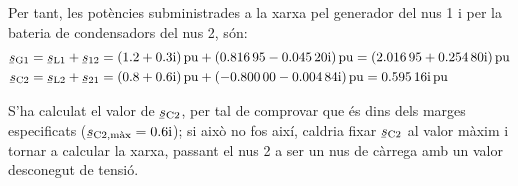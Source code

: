 \begin{exemple}
    Per tant, les potències subministrades a la xarxa pel generador del
    nus 1 i per la bateria de condensadors del nus 2, són:
    \begin{align*}
     \cmplx{s}\ped{G1} &= \cmplx{s}\ped{L1} + \cmplx{s}_{12} = \complexqty{1,2+j0,3}{pu} + \complexqty{0,81695 - j 0,04520}{pu} =
     \complexqty{2,01695 + j 0,25480}{pu} \\
     \cmplx{s}\ped{C2} &= \cmplx{s}\ped{L2} + \cmplx{s}_{21} = \complexqty{0,8+j0,6}{pu} + \complexqty{-0,80000 - j 0,00484}{pu} =
     \complexqty{  j 0,59516}{pu}
    \end{align*}

    S'ha calculat el valor de $\cmplx{s}\ped{C2}$, per tal de comprovar
    que és dins dels marges especificats
    ($\cmplx{s}\ped{C2,\text{màx}}=\complexnum{j0,6}$); si això no fos així,
    caldria fixar $\cmplx{s}\ped{C2}$ al  valor màxim i tornar a
    calcular la xarxa, passant el nus 2 a ser un nus de càrrega amb
    un valor  desconegut de tensió.
\end{exemple}


